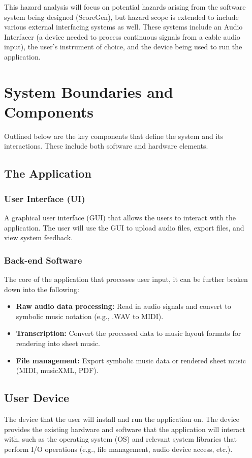 \documentclass{article}
\begin{document}
\noindent
This hazard analysis will focus on potential hazards arising from the software system being designed (ScoreGen), but 
hazard scope is extended to include various external interfacing systems as well. These systems include an Audio 
Interfacer (a device needed to process continuous signals from a cable audio input), the user’s instrument of choice, 
and the device being used to run the application.


\section{System Boundaries and Components}
Outlined below are the key components that define the system and its interactions. These include both software and hardware elements.  
\subsection{The Application}
\subsubsection{User Interface (UI)}
A graphical user interface (GUI) that allows the users to interact with the application. The user will use the GUI to upload audio files, 
export files, and view system feedback.

\subsubsection{Back-end Software}
The core of the application that processes user input, it can be further broken down into the following:
\begin{itemize}
    \item \textbf{Raw audio data processing:} Read in audio signals and convert to symbolic music notation (e.g., .WAV to MIDI).
    \item \textbf{Transcription:} Convert the processed data to music layout formats for rendering into sheet music.
    \item \textbf{File management:} Export symbolic music data or rendered sheet music (MIDI, musicXML, PDF).
\end{itemize}

\subsection{User Device}
The device that the user will install and run the application on. The device provides the existing hardware and software that the 
application will interact with, such as the operating system (OS) and relevant system libraries that perform I/O operations (e.g., 
file management, audio device access, etc.).
\end{document}
